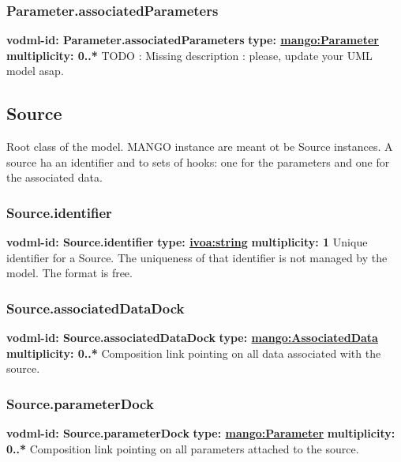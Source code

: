     \subsubsection{Parameter.associatedParameters}
      \textbf{vodml-id: Parameter.associatedParameters} \newline
      \textbf{type: \hyperref[sect:Parameter]{mango:Parameter}} \newline
      \textbf{multiplicity: 0..*} \newline 
      TODO : Missing description : please, update your UML model asap.

  \subsection{Source}
  \label{sect:Source}
    Root class of the model. MANGO instance are meant ot be Source instances. A source ha an identifier and to sets of hooks: one for the parameters and one for the associated data.

    \subsubsection{Source.identifier}
      \textbf{vodml-id: Source.identifier} \newline
      \textbf{type: \hyperref[sect:ivoa]{ivoa:string}} \newline
      \textbf{multiplicity: 1} \newline 
      Unique identifier for a Source. The uniqueness of that identifier is not managed by the model. The format is free.

    \subsubsection{Source.associatedDataDock}
      \textbf{vodml-id: Source.associatedDataDock} \newline
      \textbf{type: \hyperref[sect:AssociatedData]{mango:AssociatedData}} \newline
      \textbf{multiplicity: 0..*} \newline 
      Composition link pointing on all data associated with the source.

    \subsubsection{Source.parameterDock}
      \textbf{vodml-id: Source.parameterDock} \newline
      \textbf{type: \hyperref[sect:Parameter]{mango:Parameter}} \newline
      \textbf{multiplicity: 0..*} \newline 
      Composition link pointing on all parameters attached to the source.

